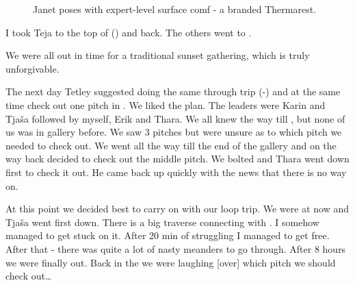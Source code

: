 \begin{figure}[b!]
\checkoddpage \ifoddpage \forcerectofloat \else \forceversofloat \fi
{}
\caption{Janet poses with expert-level surface comf - a branded Thermarest. }
\label{thermarest}
\end{figure}


I took Teja to the top of  () and back. The others went to
.

We were all out in time for a traditional sunset gathering, which is
truly unforgivable.

The next day Tetley suggested doing the same through trip
(-) and at the same time check out one pitch in .
We liked the plan. The leaders were Karin and Tjaša followed by myself,
Erik and Thara. We all knew the way till , but none of us
was in  gallery before. We saw 3 pitches but were unsure as to
which pitch we needed to check out. We went all the way till the end of
the gallery and on the way back decided to check out the middle pitch.
We bolted and Thara went down first to check it out. He came back up
quickly with the news that there is no way on.


At this point we decided
best to carry on with our loop trip. We were at  now and
Tjaša went first down. There is a big traverse connecting 
with . I somehow managed to get stuck on it. After 20 min of
struggling I managed to get free. After that  - there was quite
a lot of nasty meanders to go through. After 8 hours we were finally
out. Back in the  we were laughing [over] which pitch we should check
out\ldots{}

